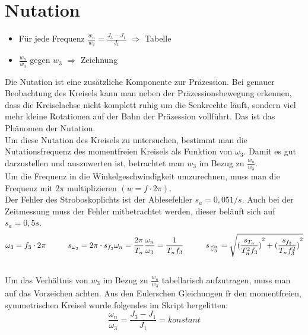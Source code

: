 

\section{Nutation}

\begin{itemize}
    \item Für jede Frequenz $\frac{w_n}{w_3} = \frac{J_3-J_1}{J_1}$ $\Rightarrow$ Tabelle
    \item $\frac{w_n}{w_3}$ gegen $w_3$ $\Rightarrow$ Zeichnung
\end{itemize}

Die Nutation ist eine zus\"atzliche Komponente zur Präzession. Bei genauer Beobachtung des Kreisels kann man neben der Präzessionsbewegung erkennen, dass die Kreiselachse nicht komplett ruhig um die Senkrechte läuft, sondern viel mehr kleine Rotationen auf der Bahn der Präzession vollführt. Das ist das Phänomen der Nutation.\\
Um diese Nutation des Kreisels zu untersuchen, bestimmt man die Nutationsfrequenz des momentfreien Kreisels als Funktion von $\omega_3$. Damit es gut darzustellen und auszuwerten ist, betrachtet man $w_3$ im Bezug zu $\frac{w_n}{w_3}$. \\
Um die Frequenz in die Winkelgeschwindigkeit umzurechnen, muss man die Frequenz mit $2\pi$ multiplizieren $(w = f\cdot2\pi)$.\\
Der Fehler des Stroboskoplichts ist der Ablesefehler $s_a = 0,05 1/s$. 
Auch bei der Zeitmessung muss der Fehler mitbetrachtet werden, dieser beläuft sich auf $s_a = 0,5s$.  \\
\begin{equation}
    \omega_3 = f_3\cdot2\pi  \tab s_{\omega_3}=2\pi\cdot{s_{f_3}} \\
    \omega_n = \frac{2\pi}{T_n} \\
    \frac{\omega_n}{\omega_3} = \frac{1}{T_nf_3} 
    \tab s_{\frac{\omega_n}{\omega_3}} = \sqrt{{(\frac{s_{T_n}}{T_n^2f_3})}^2+{(\frac{s_{f_3}}{T_nf_3^2})}^2} 
\end{equation}\\
Um das Verh\"altnis von $w_3$ im Bezug zu $\frac{w_n}{w_3}$ tabellarisch aufzutragen, muss man auf das Vorzeichen achten. Aus den Eulerschen Gleichungen f\"r den momentfreien, symmetrischen Kreisel wurde folgendes im Skript hergelitten:
\begin{equation}
    \frac{\omega_n}{\omega_3} = \frac{J_3 - J_1}{J_1} = konstant
\end{equation}\\
